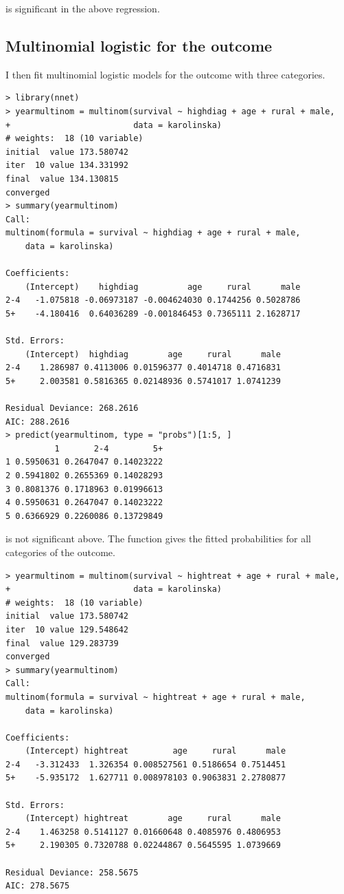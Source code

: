  is significant in the above regression. 


\subsection{Multinomial logistic for the outcome}

I then fit multinomial logistic models for the outcome with three categories. 

\begin{lstlisting}
> library(nnet)
> yearmultinom = multinom(survival ~ highdiag + age + rural + male,
+                         data = karolinska)
# weights:  18 (10 variable)
initial  value 173.580742 
iter  10 value 134.331992
final  value 134.130815 
converged
> summary(yearmultinom)
Call:
multinom(formula = survival ~ highdiag + age + rural + male, 
    data = karolinska)

Coefficients:
    (Intercept)    highdiag          age     rural      male
2-4   -1.075818 -0.06973187 -0.004624030 0.1744256 0.5028786
5+    -4.180416  0.64036289 -0.001846453 0.7365111 2.1628717

Std. Errors:
    (Intercept)  highdiag        age     rural      male
2-4    1.286987 0.4113006 0.01596377 0.4014718 0.4716831
5+     2.003581 0.5816365 0.02148936 0.5741017 1.0741239

Residual Deviance: 268.2616 
AIC: 288.2616 
> predict(yearmultinom, type = "probs")[1:5, ]
          1       2-4         5+
1 0.5950631 0.2647047 0.14023222
2 0.5941802 0.2655369 0.14028293
3 0.8081376 0.1718963 0.01996613
4 0.5950631 0.2647047 0.14023222
5 0.6366929 0.2260086 0.13729849
\end{lstlisting}

 is not significant above.  The  function gives the fitted probabilities for all categories of the outcome. 

\begin{lstlisting}
> yearmultinom = multinom(survival ~ hightreat + age + rural + male,
+                         data = karolinska)
# weights:  18 (10 variable)
initial  value 173.580742 
iter  10 value 129.548642
final  value 129.283739 
converged
> summary(yearmultinom)
Call:
multinom(formula = survival ~ hightreat + age + rural + male, 
    data = karolinska)

Coefficients:
    (Intercept) hightreat         age     rural      male
2-4   -3.312433  1.326354 0.008527561 0.5186654 0.7514451
5+    -5.935172  1.627711 0.008978103 0.9063831 2.2780877

Std. Errors:
    (Intercept) hightreat        age     rural      male
2-4    1.463258 0.5141127 0.01660648 0.4085976 0.4806953
5+     2.190305 0.7320788 0.02244867 0.5645595 1.0739669

Residual Deviance: 258.5675 
AIC: 278.5675 
\end{lstlisting}

